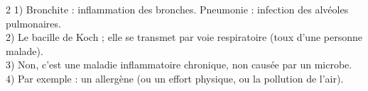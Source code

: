 \begin{multicols}{2}
1) Bronchite : inflammation des bronches. Pneumonie : infection des alvéoles
pulmonaires.\\
2) Le bacille de Koch ; elle se transmet par voie respiratoire (toux d'une personne
malade).\\
3) Non, c'est une maladie inflammatoire chronique, non causée par un microbe.\\
4) Par exemple : un allergène (ou un effort physique, ou la pollution de l'air).

\end{multicols}
\exercicesBanner
